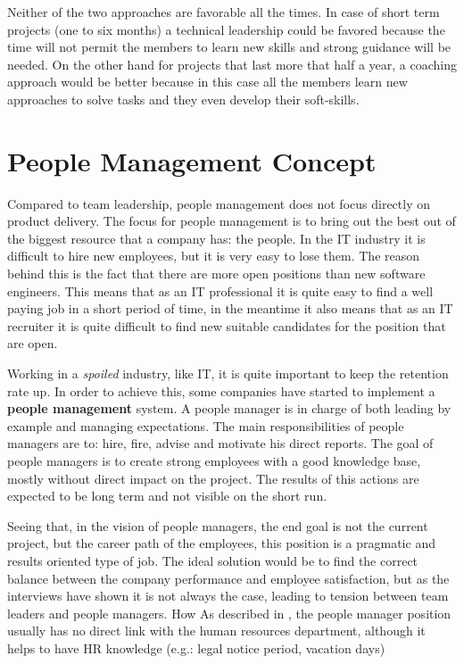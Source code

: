 Neither of the two approaches are favorable all the times. In case of short term projects (one to six months) a technical leadership could be favored because the time will not permit the members to learn new skills and strong guidance will be needed. On the other hand for projects that last more that half a year, a coaching approach would be better because in this case all the members learn new approaches to solve tasks and they even develop their soft-skills.

\section{People Management Concept}
\label{sec:proj-scope}
Compared to team leadership, people management does not focus directly on product delivery. The focus for people management is to bring out the best out of the biggest resource that a company has: the people. In the IT industry it is difficult to hire new employees, but it is very easy to lose them. The reason behind this is the fact that there are more open positions than new software engineers. This means that as an IT professional it is quite easy to find a well paying job in a short period of time, in the meantime it also means that as an IT recruiter it is quite difficult to find new suitable candidates for the position that are open. 

Working in a \textit{spoiled} industry, like IT, it is quite important to keep the retention rate up.  In order to achieve this, some companies have started to implement a \textbf{people management} system. A people manager is in charge of both leading by example and managing expectations. The main responsibilities of people managers are to: hire, fire, advise and motivate his direct reports. The goal of people managers is to create strong employees with a good knowledge base, mostly without direct impact on the project. The results of this actions are expected to be long term and not visible on the short run. 

Seeing that, in the vision of people managers, the end goal is not the current project, but the career path of the employees, this position is a pragmatic and results oriented type of job. The ideal solution would be to find the correct balance between the company performance and employee satisfaction, but as the interviews have shown it is not always the case, leading to tension between team leaders and people managers.
How 
As described in \cite{abur-pm}, the people manager position usually has no direct link with the human resources department, although it helps to have HR knowledge (e.g.: legal notice period, vacation days)

